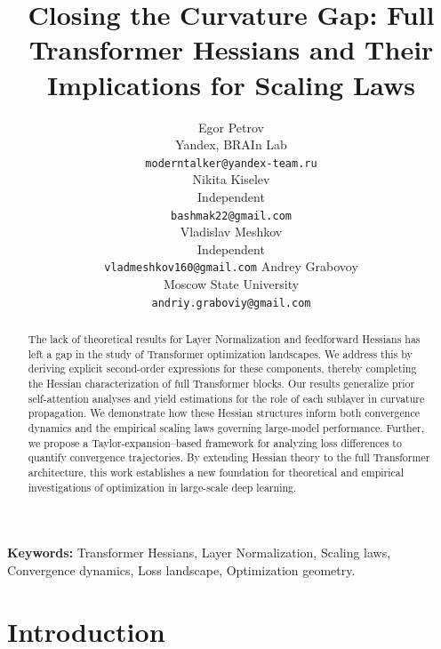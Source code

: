 \documentclass{article}
\title{Closing the Curvature Gap: Full Transformer Hessians and Their Implications for Scaling Laws}
\author{
  Egor Petrov\\
  Yandex, BRAIn Lab\\
  \texttt{moderntalker@yandex-team.ru}\\
  \And
  Nikita Kiselev\\
  Independent\\
  \texttt{bashmak22@gmail.com}\\
  \And
  Vladislav Meshkov\\
  Independent\\
  \texttt{vladmeshkov160@gmail.com}
  \And 
  Andrey Grabovoy\\
  Moscow State University\\
  \texttt{andriy.graboviy@gmail.com}\\
}
\begin{document}
\maketitle

\begin{abstract}
    The lack of theoretical results for Layer Normalization and feedforward Hessians has left a gap in the study of Transformer optimization landscapes. We address this by deriving explicit second-order expressions for these components, thereby completing the Hessian characterization of full Transformer blocks. Our results generalize prior self-attention analyses and yield estimations for the role of each sublayer in curvature propagation. We demonstrate how these Hessian structures inform both convergence dynamics and the empirical scaling laws governing large-model performance. Further, we propose a Taylor-expansion–based framework for analyzing loss differences to quantify convergence trajectories. By extending Hessian theory to the full Transformer architecture, this work establishes a new foundation for theoretical and empirical investigations of optimization in large-scale deep learning.
\end{abstract}

\textbf{Keywords:} Transformer Hessians, Layer Normalization, Scaling laws, Convergence dynamics, Loss landscape, Optimization geometry.

\section{Introduction}\label{sec:intro}
\end{document}

